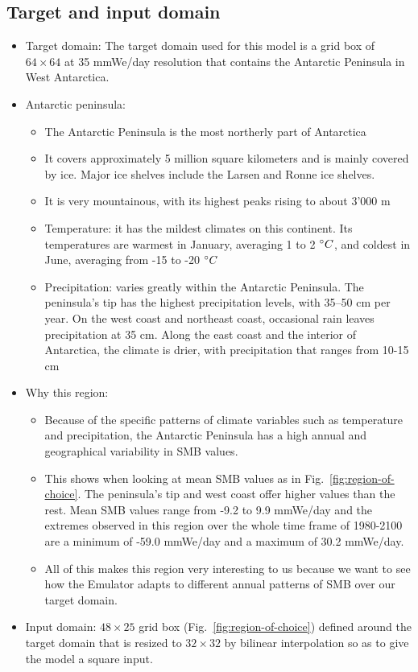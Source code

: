 \documentclass[a4paper,11pt,oneside]{report}
\begin{document}
\subsection{Target and input domain}
\begin{itemize}
   \item Target domain: The target domain used for this model is a grid box of $64 \times 64$ at 35 \si{mmWe/day} resolution that contains the Antarctic Peninsula in West Antarctica. 
    \item Antarctic peninsula: 
    \begin{itemize}
        \item The Antarctic Peninsula is the most northerly part of Antarctica
        \item It covers approximately 5 million square kilometers and is mainly covered by ice. Major ice shelves include the Larsen and Ronne ice shelves.
        \item It is very mountainous, with its highest peaks rising to about 3'000 m
        \item Temperature: it has the mildest climates on this continent. Its temperatures are warmest in January, averaging 1 to 2 $\degree C$, and coldest in June, averaging from -15 to -20 $\degree C$~\cite{AntarcticPeninsula}
        \item Precipitation: varies greatly within the Antarctic Peninsula. The peninsula's tip has the highest precipitation levels, with 35–50 cm per year. On the west coast and northeast coast, occasional rain leaves precipitation at 35 cm. Along the east coast and the interior of Antarctica, the climate is drier, with precipitation that ranges from 10-15 cm~\cite{antarctic-climate, antarctic-climate-2}
    \end{itemize} 
    \item Why this region: 
    \begin{itemize}
        \item Because of the specific patterns of climate variables such as temperature and precipitation, the Antarctic Peninsula has a high annual and geographical variability in SMB values. 
        \item This shows when looking at mean SMB values as in Fig.~\ref{fig:region-of-choice}. The peninsula's tip and west coast offer higher values than the rest. Mean SMB values range from -9.2 to 9.9 \si{mmWe/day} and the extremes observed in this region over the whole time frame of 1980-2100 are a minimum of -59.0 \si{mmWe/day} and a maximum of 30.2 \si{mmWe/day}. 
        \item All of this makes this region very interesting to us because we want to see how the Emulator adapts to different annual patterns of SMB over our target domain.  
    \end{itemize}
    \item Input domain: $48\times25$ grid box (Fig.~\ref{fig:region-of-choice}) defined around the target domain that is resized to $32\times 32$ by bilinear interpolation so as to give the model a square input.
\end{itemize}
\end{document}
